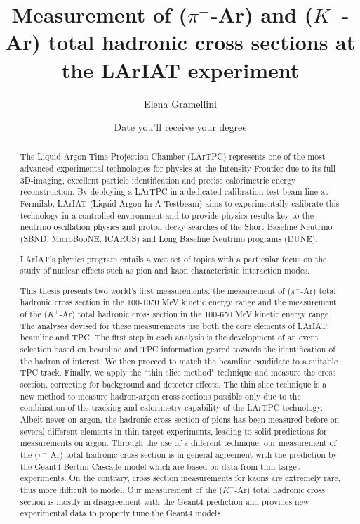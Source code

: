 \documentclass[letterpaper,12pt]{yalephd}
\begin{document}
\title{Measurement of ($\pi^-$-Ar) and ($K^+$-Ar) total hadronic cross sections at the LArIAT experiment}
\author{Elena Gramellini}
\date{Date you'll receive your degree} %

\frontmatter

\begin{abstract}

The Liquid Argon Time Projection Chamber (LArTPC) represents one of the
most advanced experimental technologies for physics at the Intensity
Frontier due to its full 3D-imaging, excellent particle identification
and precise calorimetric energy reconstruction. By deploying a LArTPC in
a dedicated calibration test beam line at Fermilab, LArIAT (Liquid
Argon In A Testbeam) aims to experimentally calibrate this technology
in a controlled environment and to provide physics results key to the
neutrino oscillation physics and proton decay searches of the Short
Baseline Neutrino (SBND, MicroBooNE, ICARUS) and Long Baseline Neutrino programs (DUNE).

LArIAT's physics program entails a vast set of topics with a
particular focus on the study of nuclear effects such as pion and
kaon characteristic interaction modes. 

This thesis presents two world's first measurements: the measurement of ($\pi^-$-Ar) total hadronic cross section in the 100-1050 MeV kinetic energy range and the measurement of the ($K^+$-Ar) total hadronic cross section in the 100-650 MeV kinetic energy range. The analyses devised for these measurements use both the core elements of LArIAT: beamline and TPC. The first step in each analysis is the development of an event selection based on  beamline and TPC information geared towards the identification of the hadron of interest. We then proceed to match the beamline candidate to a suitable TPC track. Finally,  we apply the ``thin slice method" technique and measure the cross section, correcting for background and detector effects. The thin slice technique is a new method to measure hadron-argon cross sections possible only due to the combination of the tracking and calorimetry capability of the LArTPC technology. 
Albeit never on argon, the hadronic cross section of pions has been measured before on several different elements in thin target experiments, leading to solid predictions for measurements on argon. Through the use of a different technique, our measurement of the  ($\pi^-$-Ar) total hadronic cross section is in general agreement with the prediction by the Geant4 Bertini Cascade model which are based on data from thin target experiments. On the contrary, cross section measurements for kaons are extremely rare, thus more difficult to model. Our measurement of the  ($K^+$-Ar) total hadronic cross section is mostly in disagreement with the Geant4 prediction and provides new experimental data to properly tune the Geant4 models.


\end{abstract}
\end{document}
